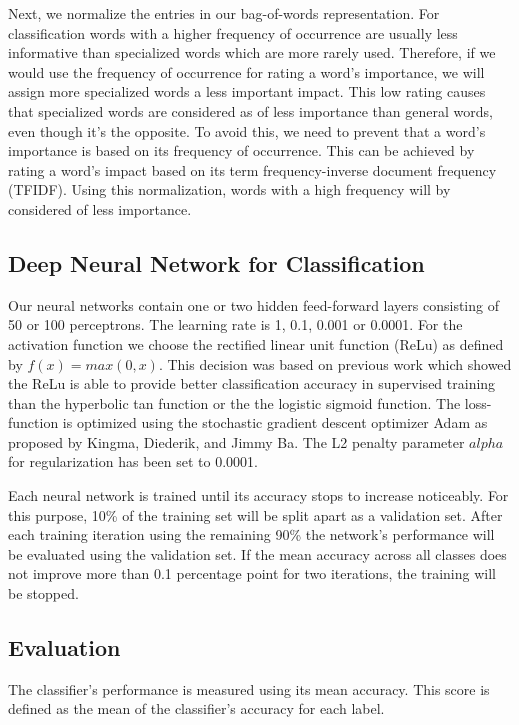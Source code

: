 \documentclass[sigconf]{acmart}
\begin{document}

Next, we normalize the entries in our bag-of-words representation. For classification words with a higher frequency of occurrence are usually less informative than specialized words which are more rarely used. Therefore, if we would use the frequency of occurrence for rating a word's importance, we will assign more specialized words a less important impact. This low rating causes that specialized words are considered as of less importance than general words, even though it's the opposite. To avoid this, we need to prevent that a word's importance is based on its frequency of occurrence. This can be achieved by rating a word's impact based on its term frequency-inverse document frequency (TFIDF). Using this normalization, words with a high frequency will by considered of less importance.

\subsection{Deep Neural Network for Classification}

Our neural networks contain one or two hidden feed-forward layers consisting of 50 or 100 perceptrons. The learning rate is 1, 0.1, 0.001 or 0.0001. For the activation function we choose the rectified linear unit function (ReLu) as defined by $f(x) = max(0, x)$. This decision was based on previous work which showed the ReLu is able to provide better classification accuracy in supervised training than the hyperbolic tan function or the the logistic sigmoid function\cite{pmlr-v15-glorot11a}. The loss-function is optimized using the stochastic gradient descent optimizer Adam as proposed by Kingma, Diederik, and Jimmy Ba\cite{adam}. The L2 penalty parameter $alpha$ for regularization has been set to 0.0001.

Each neural network is trained until its accuracy stops to increase noticeably. For this purpose, 10\% of the training set will be split apart as a validation set. After each training iteration using the remaining 90\% the network's performance will be evaluated using the validation set. If the mean accuracy across all classes does not improve more than 0.1 percentage point for two iterations, the training will be stopped. 

\subsection{Evaluation}

The classifier's performance is measured using its mean accuracy. This score is defined as the mean of the classifier's accuracy for each label.
\end{document}

